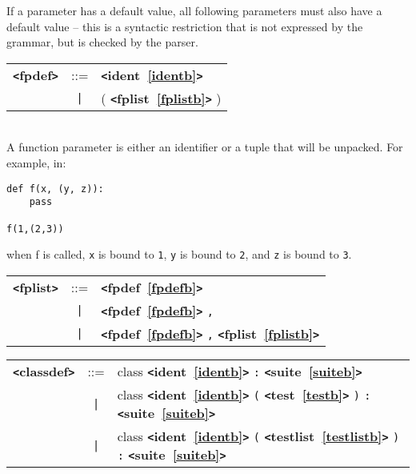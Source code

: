 \documentclass[12pt]{article}
\begin{document}
If a parameter has a default value, all following parameters must also have a 
default value -- this is a syntactic restriction that is not expressed by the grammar, but is checked by the parser.   


\label{fpdefb}
\begin{tabular}{lcl}
{\bf \verb+<+fpdef\verb+>+} & ::=  & {\bf \verb+<+ident~\ref{identb}\verb+>+}  \\
 & \verb+|+  & ( {\bf \verb+<+fplist~\ref{fplistb}\verb+>+}  ) \\
\end{tabular} \\

A function parameter is either an identifier or a tuple that will be unpacked.  For example, in:
\begin{verbatim}
def f(x, (y, z)):
    pass

f(1,(2,3))
\end{verbatim}
when f is called, \verb|x| is bound to \verb|1|, \verb|y| is bound to \verb|2|, and
\verb|z| is bound to \verb|3|. \\

\label{fplistb}
\begin{tabular}{lcl}
{\bf \verb+<+fplist\verb+>+} & ::=  & {\bf \verb+<+fpdef~\ref{fpdefb}\verb+>+}  \\
 & \verb+|+  & {\bf \verb+<+fpdef~\ref{fpdefb}\verb+>+}  \verb|,| \\
 & \verb+|+  & {\bf \verb+<+fpdef~\ref{fpdefb}\verb+>+}  \verb|,| {\bf \verb+<+fplist~\ref{fplistb}\verb+>+}  \\
\end{tabular}

\label{classdefb}
\begin{tabular}{lcl}
{\bf \verb+<+classdef\verb+>+} & ::=  & class {\bf \verb+<+ident~\ref{identb}\verb+>+}  \verb|:| {\bf \verb+<+suite~\ref{suiteb}\verb+>+}  \\
 & \verb+|+  & class {\bf \verb+<+ident~\ref{identb}\verb+>+}  \verb|(| {\bf \verb+<+test~\ref{testb}\verb+>+}  \verb|)| \verb|:| {\bf \verb+<+suite~\ref{suiteb}\verb+>+}  \\
 & \verb+|+  & class {\bf \verb+<+ident~\ref{identb}\verb+>+}  \verb|(| {\bf \verb+<+testlist~\ref{testlistb}\verb+>+}  \verb|)| \verb|:| {\bf \verb+<+suite~\ref{suiteb}\verb+>+}  \\
\end{tabular} \\
\end{document}
